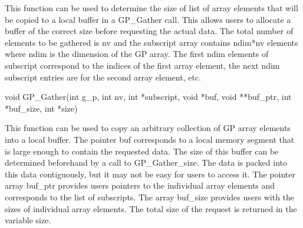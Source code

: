 \documentclass[12pt]{article}
\begin{document}
\local

\begin{desc}

This function can be used to determine the size of list of array elements that
will be copied to a local buffer in a GP\_Gather call. This allows users to
allocate a buffer of the correct size before requesting the actual data. The
total number of elements to be gathered is nv and the
subscript array contains ndim*nv elements where ndim is the dimension of the GP
array. The first ndim elements of subscript correspond to the indices of the first
array element, the next ndim subscript entries are for the second array element,
etc.

\end{desc}



\begin{capi}
\begin{ccode}
void GP\_Gather(int g\_p, int nv, int *subscript, void *buf, void **buf\_ptr,
                int *buf\_size, int *size)
\begin{funcargs}
\end{funcargs}
\end{ccode}
\end{capi}

\local

\begin{desc}

This function can be used to copy an arbitrary collection of GP array elements
into a local buffer. The pointer buf corresponds to a local memory segment that
is large enough to contain the requested data. The size of this buffer can be
determined beforehand by a call to GP\_Gather\_size. The data is packed into
this data contiguously, but it may not be easy for users to access it. The
pointer array buf\_ptr provides users pointers to the individual array elements
and corresponds to the list of subscripts. The array buf\_size provides users
with the sizes of individual array elements. The total size of the request is
returned in the variable size.

\end{desc}
\end{document}

